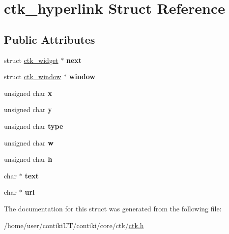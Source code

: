 \hypertarget{structctk__hyperlink}{}\section{ctk\+\_\+hyperlink Struct Reference}
\label{structctk__hyperlink}
\subsection*{Public Attributes}
\begin{DoxyCompactItemize}
\item 
\hypertarget{structctk__hyperlink_a9f8d4df2c3ef1bdac8f22b9bc442874f}{}struct \hyperlink{structctk__widget}{ctk\+\_\+widget} $\ast$ {\bfseries next}\label{structctk__hyperlink_a9f8d4df2c3ef1bdac8f22b9bc442874f}

\item 
\hypertarget{structctk__hyperlink_ac35d95829f1fc55ae9a917e02bb293d6}{}struct \hyperlink{structctk__window}{ctk\+\_\+window} $\ast$ {\bfseries window}\label{structctk__hyperlink_ac35d95829f1fc55ae9a917e02bb293d6}

\item 
\hypertarget{structctk__hyperlink_a2094dabb13aed7c8da3f39d9ccec3ba4}{}unsigned char {\bfseries x}\label{structctk__hyperlink_a2094dabb13aed7c8da3f39d9ccec3ba4}

\item 
\hypertarget{structctk__hyperlink_a0db62dcd3d7beef2412c22bd9cec018d}{}unsigned char {\bfseries y}\label{structctk__hyperlink_a0db62dcd3d7beef2412c22bd9cec018d}

\item 
\hypertarget{structctk__hyperlink_af99c9377d31204c56e37d5500b2f87af}{}unsigned char {\bfseries type}\label{structctk__hyperlink_af99c9377d31204c56e37d5500b2f87af}

\item 
\hypertarget{structctk__hyperlink_abbdc981947fb62efc29075e361a5705a}{}unsigned char {\bfseries w}\label{structctk__hyperlink_abbdc981947fb62efc29075e361a5705a}

\item 
\hypertarget{structctk__hyperlink_a378f8c371e57205f134ec5c01d0f68b4}{}unsigned char {\bfseries h}\label{structctk__hyperlink_a378f8c371e57205f134ec5c01d0f68b4}

\item 
\hypertarget{structctk__hyperlink_ac5b0ae8eb52672639ba5f58fef5315fe}{}char $\ast$ {\bfseries text}\label{structctk__hyperlink_ac5b0ae8eb52672639ba5f58fef5315fe}

\item 
\hypertarget{structctk__hyperlink_a64d0a4d220f2df13bc0abce859de2fab}{}char $\ast$ {\bfseries url}\label{structctk__hyperlink_a64d0a4d220f2df13bc0abce859de2fab}

\end{DoxyCompactItemize}


The documentation for this struct was generated from the following file\+:\begin{DoxyCompactItemize}
\item 
/home/user/contiki\+U\+T/contiki/core/ctk/\hyperlink{ctk_8h}{ctk.\+h}\end{DoxyCompactItemize}
